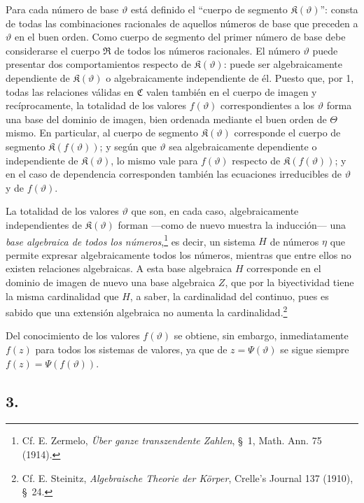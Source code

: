 \documentclass[11pt]{article}
\begin{document}
Para cada número de base $\vartheta$ está definido el ``cuerpo de segmento $\mathfrak K(\vartheta)$'': consta de todas las combinaciones racionales de aquellos números de base que preceden a $\vartheta$ en el buen orden. Como cuerpo de segmento del primer número de base debe considerarse el cuerpo $\mathfrak R$ de todos los números racionales. El número $\vartheta$ puede presentar dos comportamientos respecto de $\mathfrak K(\vartheta)$: puede ser algebraicamente dependiente de $\mathfrak K(\vartheta)$ o algebraicamente independiente de él. Puesto que, por 1, todas las relaciones válidas en $\mathfrak C$ valen también en el cuerpo de imagen y recíprocamente, la totalidad de los valores $f(\vartheta)$ correspondientes a los $\vartheta$ forma una base del dominio de imagen, bien ordenada mediante el buen orden de $\Theta$ mismo. En particular, al cuerpo de segmento $\mathfrak K(\vartheta)$ corresponde el cuerpo de segmento $\mathfrak K(f(\vartheta))$; y según que $\vartheta$ sea algebraicamente dependiente o independiente de $\mathfrak K(\vartheta)$, lo mismo vale para $f(\vartheta)$ respecto de $\mathfrak K(f(\vartheta))$; y en el caso de dependencia corresponden también las ecuaciones irreducibles de $\vartheta$ y de $f(\vartheta)$.

La totalidad de los valores $\vartheta$ que son, en cada caso, algebraicamente independientes de $\mathfrak K(\vartheta)$ forman ---como de nuevo muestra la inducción--- una \emph{base algebraica de todos los números},\footnote{Cf. E. Zermelo, \emph{Über ganze transzendente Zahlen}, \S\ 1, Math. Ann. 75 (1914).} es decir, un sistema $H$ de números $\eta$ que permite expresar algebraicamente todos los números, mientras que entre ellos no existen relaciones algebraicas. A esta base algebraica $H$ corresponde en el dominio de imagen de nuevo una base algebraica $Z$, que por la biyectividad tiene la misma cardinalidad que $H$, a saber, la cardinalidad del continuo, pues es sabido que una extensión algebraica no aumenta la cardinalidad.\footnote{Cf. E. Steinitz, \emph{Algebraische Theorie der Körper}, Crelle's Journal 137 (1910), \S\ 24.}

Del conocimiento de los valores $f(\vartheta)$ se obtiene, sin embargo, inmediatamente $f(z)$ para todos los sistemas de valores, ya que de $z=\Psi(\vartheta)$ se sigue siempre $f(z)=\Psi(f(\vartheta))$.

\subsection*{3.}
\end{document}
